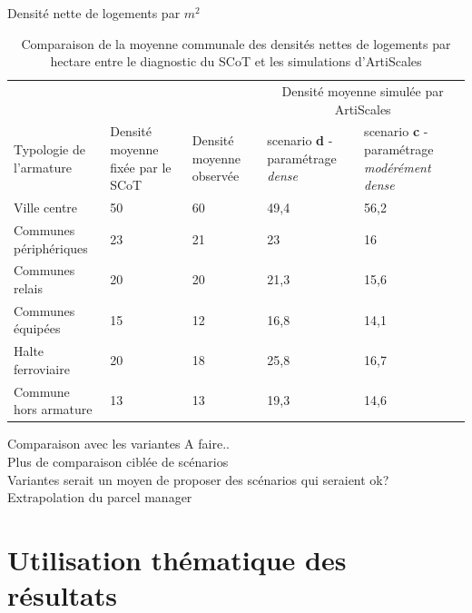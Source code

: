 \documentclass[xcolor=table]{beamer}
\begin{document}
\begin{frame}{Densité nette de logements par $m^{2}$}
\begin{table}[h]
	{\footnotesize \caption{Comparaison de la moyenne communale des densités nettes de logements par hectare entre le diagnostic du SCoT et les simulations d'ArtiScales}
}	\tiny 
	\begin{center}
		\begin{tabular}{m{2.5cm}m{1.5cm}m{1.3cm}m{2cm}m{2cm}}
			\toprule
			\rowcolor[gray]{0.75}
			&&&\multicolumn{2}{c}{Densité moyenne simulée par ArtiScales} \\
			\rowcolor[gray]{0.9}
			Typologie de l'armature &
			Densité moyenne fixée par le SCoT &
			Densité moyenne observée&
			scenario \textbf{d} - paramétrage \textit{dense} &
			scenario \textbf{c} - paramétrage \textit{modérément dense} \\ \hline
			
			Ville centre&50&60&49,4&56,2\\ \hline
			\rowcolor[gray]{0.9}Communes périphériques&23&21&23&16\\ \hline
			Communes relais &20&20&21,3&15,6\\ \hline
			\rowcolor[gray]{0.9}Communes équipées&15&12&16,8&14,1\\ \hline
			Halte ferroviaire&20&18&25,8&16,7 \\ \hline
			\rowcolor[gray]{0.9}Commune hors armature&13&13&19,3 &14,6\\ \hline
		\end{tabular}
	\end{center}
\end{table}
\end{frame}

\begin{frame}{Comparaison avec les variantes}
A faire..
\\
Plus de comparaison ciblée de scénarios
\\
Variantes serait un moyen de proposer des scénarios qui seraient ok? 
\\
Extrapolation du parcel manager
\end{frame}

\section{Utilisation thématique des résultats}
\end{document}
